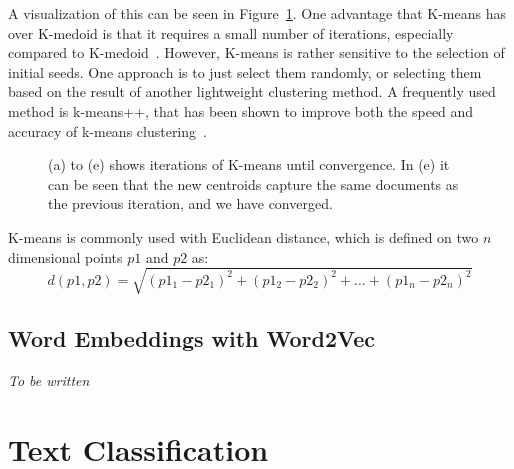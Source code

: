 A visualization of this can be seen in Figure~\ref{fig:kmeans-iterations}.
One advantage that K-means has over K-medoid is that it requires a small number of iterations, especially compared to K-medoid~\cite{aggarwal2012survey, schutze1997projections}.
However, K-means is rather sensitive to the selection of initial seeds.
One approach is to just select them randomly, or selecting them based on the result of another lightweight clustering method.
A frequently used method is k-means++, that has been shown to improve both the speed and accuracy of k-means clustering~\cite{arthur2007k}.

\begin{figure}[h!]
    \centering
    \newline
    \caption{(a) to (e) shows iterations of K-means until convergence.
        In (e) it can be seen that the new centroids capture the same documents as the previous iteration, and we have converged.}
    \label{fig:kmeans-iterations}
\end{figure}

K-means is commonly used with Euclidean distance, which is defined on two $n$ dimensional points $p1$ and $p2$ as:
\begin{equation}
    d(p1, p2) = \sqrt{(p1_1 - p2_1)^2 + (p1_2 - p2_2)^2 + \hdots + (p1_n - p2_n)^2}
\end{equation}

\subsection{Word Embeddings with Word2Vec}

\textit{To be written}

\section{Text Classification}

